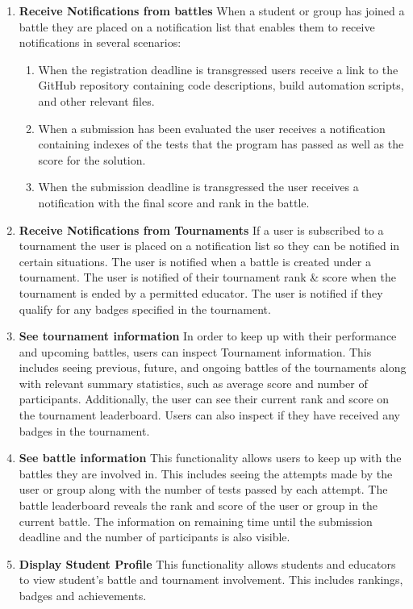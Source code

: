 \begin{enumerate}
    \item {\textbf{Receive Notifications from battles}}\newline
    When a student or group has joined a battle they are placed on a notification list that enables them to receive notifications in several scenarios:
    \begin{enumerate}
        \item When the registration deadline is transgressed users receive a link to the GitHub repository containing code descriptions, build automation scripts, and other relevant files. 
        \item When a submission has been evaluated the user receives a notification containing indexes of the tests that the program has passed as well as the score for the solution.
        \item When the submission deadline is transgressed the user receives a notification with the final score and rank in the battle.
    \end{enumerate}
    \item {\textbf{Receive Notifications from Tournaments}}\newline
    If a user is subscribed to a tournament the user is placed on a notification list so they can be notified in certain situations. The user is notified when a battle is created under a tournament. The user is notified of their tournament rank \& score when the tournament is ended by a permitted educator. The user is notified if they qualify for any badges specified in the tournament. 
    \item {\textbf{See tournament information}}\newline
    In order to keep up with their performance and upcoming battles, users can inspect Tournament information. This includes seeing previous, future, and ongoing battles of the tournaments along with relevant summary statistics, such as average score and number of participants. Additionally, the user can see their current rank and score on the tournament leaderboard. Users can also inspect if they have received any badges in the tournament. 
    \item {\textbf{See battle information}}\newline
    This functionality allows users to keep up with the battles they are involved in. This includes seeing the attempts made by the user or group along with the number of tests passed by each attempt. The battle leaderboard reveals the rank and score of the user or group in the current battle. The information on remaining time until the submission deadline and the number of participants is also visible.

    \item {\textbf{Display Student Profile}}\newline
    This functionality allows students and educators to view student's battle and tournament involvement. This includes rankings, badges and achievements. 
\end{enumerate}

